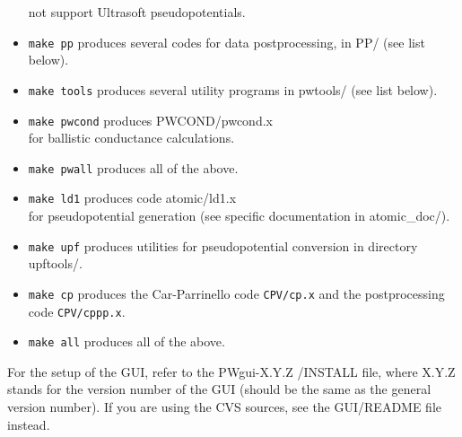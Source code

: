 \documentclass[12pt,a4paper]{article}
\begin{document}
\begin{itemize}
  not support Ultrasoft pseudopotentials. 
\item  \texttt{make pp} produces several codes for data postprocessing, in PP/
  (see list below). 
\item \texttt{make tools} produces several utility programs in pwtools/ (see
  list below).  
\item \texttt{make pwcond} produces PWCOND/pwcond.x\\
 for ballistic conductance calculations.
\item \texttt{make pwall} produces all of the above.
\item \texttt{make ld1} produces code atomic/ld1.x\\
for pseudopotential generation (see specific documentation in atomic\_doc/).
\item \texttt{make upf} produces utilities for pseudopotential conversion in
  directory upftools/.
\item \texttt{make cp} produces the Car-Parrinello code \texttt{CPV/cp.x}
  and the postprocessing code \texttt{CPV/cppp.x}. 
\item \texttt{make all} produces all of the above.
\end{itemize}
For the setup of the GUI, refer to the PWgui-X.Y.Z /INSTALL file, where
X.Y.Z stands for the version number of the GUI (should be the same as the
general version number). If you are using the CVS sources, see
the GUI/README file instead.
   
\end{document}
